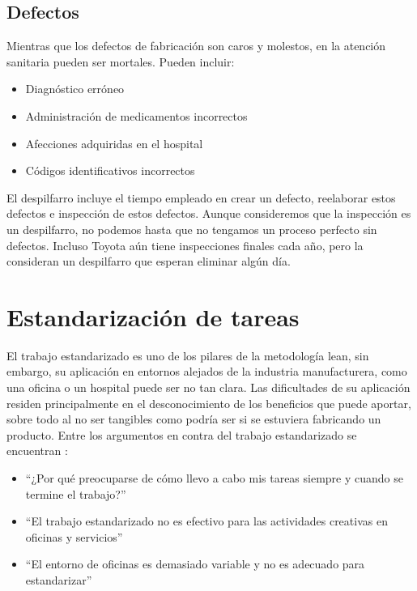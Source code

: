 \subsection{Defectos}

Mientras que los defectos de fabricación son caros y molestos, en la atención sanitaria pueden ser mortales.
Pueden incluir:

\begin{itemize}
    \item Diagnóstico erróneo
    \item Administración de medicamentos incorrectos
    \item Afecciones adquiridas en el hospital
    \item Códigos identificativos incorrectos
\end{itemize}

El despilfarro incluye el tiempo empleado en crear un defecto, reelaborar estos defectos e inspección de estos defectos.
Aunque consideremos que la inspección es un despilfarro, no podemos hasta que no tengamos un proceso perfecto sin defectos.
Incluso Toyota aún tiene inspecciones finales cada año, pero la consideran un despilfarro que esperan eliminar algún día.

\section{Estandarización de tareas}

El trabajo estandarizado es uno de los pilares de la metodología lean, sin embargo, su aplicación en entornos alejados de la industria manufacturera, como una oficina o un hospital puede ser no tan clara.
Las dificultades de su aplicación residen principalmente en el desconocimiento de los beneficios que puede aportar, sobre todo al no ser tangibles como podría ser si se estuviera fabricando un producto.
Entre los argumentos en contra del trabajo estandarizado se encuentran \cite{locher_lean_2017}:

\begin{itemize}
    \item ``¿Por qué preocuparse de cómo llevo a cabo mis tareas siempre y cuando se termine el trabajo?''
    \item ``El trabajo estandarizado no es efectivo para las actividades creativas en oficinas y servicios''
    \item ``El entorno de oficinas es demasiado variable y no es adecuado para estandarizar''
\end{itemize}

